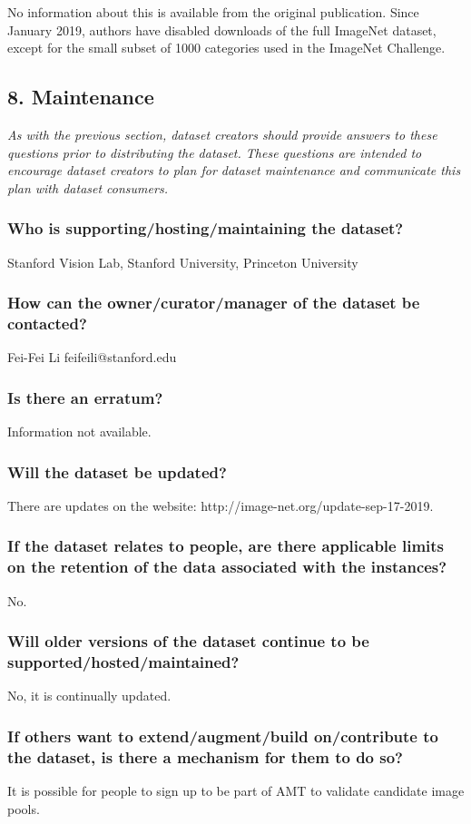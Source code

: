 \documentclass[a4paper,12pt]{article}
\begin{document}
No information about this is available from the original publication. Since January 2019, authors
have disabled downloads of the full ImageNet dataset, except for the small subset of 1000
categories used in the ImageNet Challenge.

\subsection*{8. Maintenance}

\textsl{As with the previous section, dataset creators should provide
answers to these questions prior to distributing the dataset. These questions are
intended to encourage dataset creators to plan for dataset maintenance and
communicate this plan with dataset consumers.}

\subsubsection*{Who is supporting/hosting/maintaining the dataset?}

Stanford Vision Lab, Stanford University, Princeton University

\subsubsection*{How can the owner/curator/manager of the dataset be contacted?}

Fei-Fei Li feifeili@stanford.edu

\subsubsection*{Is there an erratum?}

Information not available.
\subsubsection*{Will the dataset be updated?}

There are updates on the website: http://image-net.org/update-sep-17-2019.

\subsubsection*{If the dataset relates to people, are there applicable limits on the retention of the data associated
with the instances?}
No.

\subsubsection*{Will older versions of the dataset continue to be supported/hosted/maintained?}

No, it is continually updated.

\subsubsection*{If others want to extend/augment/build on/contribute to the dataset, is there a mechanism for
  them to do so?}

It is possible for people to sign up to be part of AMT to validate candidate image pools.
\end{document}
